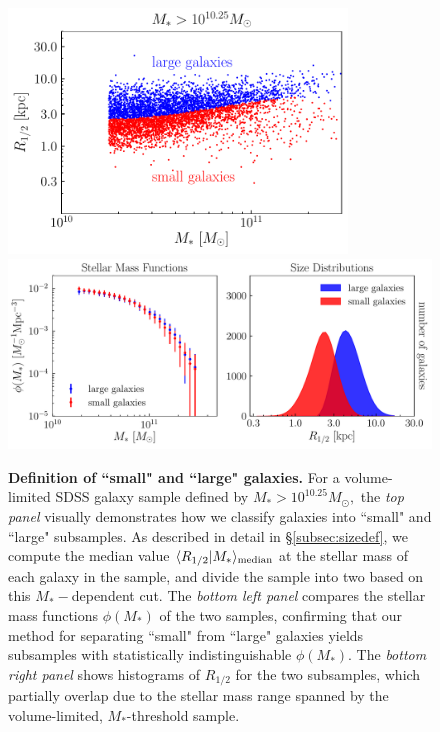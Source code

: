 \documentclass[usenatbib,usegraphicx,letterpaper]{mn2e}
\newcommand{\rhalf}{R_{1/2}}
\newcommand{\mstar}{M_{\ast}}
\newcommand{\median}[2]{\langle{#1}\vert{#2}\rangle_{\rm median}}
\begin{document}
\begin{figure}
\centering
\includegraphics[width=9cm]{FIGS/sdss_size_vs_mstar_scatter.pdf}
\includegraphics[width=\textwidth]{FIGS/sdss_small_large_sample_definitions.pdf}
\caption{
{\bf Definition of ``small" and ``large" galaxies.} For a volume-limited SDSS galaxy sample defined by $M_{\ast}>10^{10.25}M_{\odot},$ the {\em top panel} visually demonstrates how we classify galaxies into ``small" and ``large" subsamples. As described in detail in \S\ref{subsec:sizedef}, we compute the median value $\median{\rhalf}{\mstar}$ at the stellar mass of each galaxy in the sample, and divide the sample into two based on this $\mstar-$dependent cut. The {\em bottom left panel} compares the stellar mass functions $\phi(\mstar)$ of the two samples, confirming that our method for separating ``small" from ``large" galaxies yields subsamples with statistically indistinguishable $\phi(\mstar)$. The {\em bottom right panel} shows histograms of $\rhalf$ for the two subsamples, which partially overlap due to the stellar mass range spanned by the volume-limited, $\mstar$-threshold sample.
}
\label{fig:sizedefinition}
\end{figure}
\end{document}
